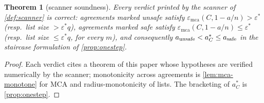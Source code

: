 \documentclass[11pt]{article}
\newtheorem{theorem}{Theorem}[section]
\theoremstyle{definition}
\theoremstyle{remark}
\newcommand{\emca}{\varepsilon_{\mathrm{mca}}}
\begin{document}
\begin{theorem}[scanner soundness]\label{thm:scanner-sound}
Every verdict printed by the scanner of \cref{def:scanner} is correct: agreements marked unsafe satisfy $\emca(C,1-a/n)>\varepsilon^*$ \textup(resp.\ list size $>\varepsilon^*q$\textup), agreements marked safe satisfy $\emca(C,1-a/n)\le\varepsilon^*$ \textup(resp.\ list size $\le\varepsilon^*q$, for every $m$\textup), and consequently $a_{\rm unsafe}<a^*_C\le a_{\rm safe}$ in the staircase formulation of \cref{prop:onestep}.
\end{theorem}

\begin{proof}
Each verdict cites a theorem of this paper whose hypotheses are verified numerically by the scanner; monotonicity across agreements is \cref{lem:mca-monotone} for MCA and radius-monotonicity of lists. The bracketing of $a^*_C$ is \cref{prop:onestep}.
\end{proof}
\end{document}
